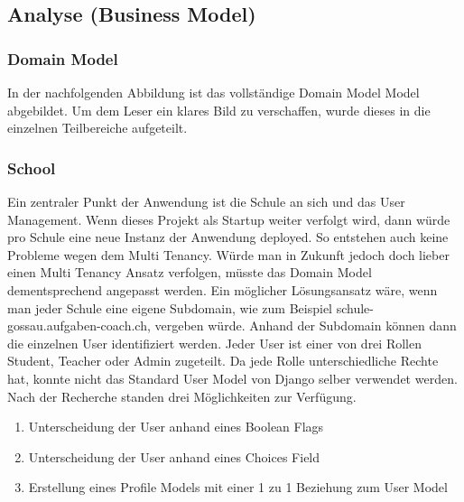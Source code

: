 \subsection{Analyse (Business Model)}
\subsubsection{Domain Model}
In der nachfolgenden Abbildung ist das vollständige Domain Model Model abgebildet. Um dem Leser ein klares Bild zu verschaffen, wurde dieses in die einzelnen Teilbereiche aufgeteilt.

\subsubsection*{School}
Ein zentraler Punkt der Anwendung ist die Schule an sich und das User Management. Wenn dieses Projekt als Startup weiter verfolgt wird, dann würde pro Schule eine neue Instanz der Anwendung deployed. So entstehen auch keine Probleme wegen dem Multi Tenancy. Würde man in Zukunft jedoch doch lieber einen Multi Tenancy Ansatz verfolgen, müsste das Domain Model dementsprechend angepasst werden. Ein möglicher Lösungsansatz wäre, wenn man jeder Schule eine eigene Subdomain, wie zum Beispiel schule-gossau.aufgaben-coach.ch, vergeben würde. Anhand der Subdomain können dann die einzelnen User identifiziert werden.
Jeder User ist einer von drei Rollen Student, Teacher oder Admin zugeteilt. Da jede Rolle unterschiedliche Rechte hat, konnte nicht das Standard User Model von Django selber verwendet werden. Nach der Recherche standen drei Möglichkeiten zur Verfügung.

\begin{enumerate}
	\item Unterscheidung der User anhand eines Boolean Flags
	\item Unterscheidung der User anhand eines Choices Field 
	\item Erstellung eines Profile Models mit einer 1 zu 1 Beziehung zum User Model
\end{enumerate}

